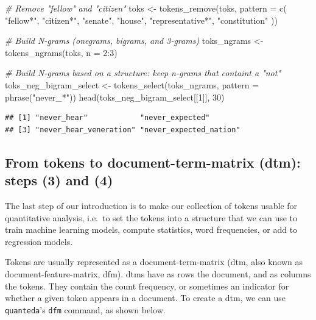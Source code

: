 \documentclass[
  12pt,
]{style/krantz}
\newenvironment{Shaded}{\begin{snugshade}}{\end{snugshade}}
\newcommand{\AttributeTok}[1]{\textcolor[rgb]{0.77,0.63,0.00}{#1}}
\newcommand{\CommentTok}[1]{\textcolor[rgb]{0.56,0.35,0.01}{\textit{#1}}}
\newcommand{\DecValTok}[1]{\textcolor[rgb]{0.00,0.00,0.81}{#1}}
\newcommand{\FunctionTok}[1]{\textcolor[rgb]{0.00,0.00,0.00}{#1}}
\newcommand{\NormalTok}[1]{#1}
\newcommand{\OtherTok}[1]{\textcolor[rgb]{0.56,0.35,0.01}{#1}}
\newcommand{\SpecialCharTok}[1]{\textcolor[rgb]{0.00,0.00,0.00}{#1}}
\newcommand{\StringTok}[1]{\textcolor[rgb]{0.31,0.60,0.02}{#1}}
\begin{document}
\begin{Shaded}
\begin{Highlighting}[]
\CommentTok{\# Remove "fellow" and "citizen"}
\NormalTok{toks }\OtherTok{\textless{}{-}} \FunctionTok{tokens\_remove}\NormalTok{(toks, }\AttributeTok{pattern =} \FunctionTok{c}\NormalTok{(}
    \StringTok{"fellow*"}\NormalTok{,}
    \StringTok{"citizen*"}\NormalTok{,}
    \StringTok{"senate"}\NormalTok{,}
    \StringTok{"house"}\NormalTok{,}
    \StringTok{"representative*"}\NormalTok{,}
    \StringTok{"constitution"}
\NormalTok{))}

\CommentTok{\# Build N{-}grams (onegrams, bigrams, and 3{-}grams)}
\NormalTok{toks\_ngrams }\OtherTok{\textless{}{-}} \FunctionTok{tokens\_ngrams}\NormalTok{(toks, }\AttributeTok{n =} \DecValTok{2}\SpecialCharTok{:}\DecValTok{3}\NormalTok{)}

\CommentTok{\# Build N{-}grams based on a structure: keep n{-}grams that containt a "not"}
\NormalTok{toks\_neg\_bigram\_select }\OtherTok{\textless{}{-}} \FunctionTok{tokens\_select}\NormalTok{(toks\_ngrams, }\AttributeTok{pattern =} \FunctionTok{phrase}\NormalTok{(}\StringTok{"never\_*"}\NormalTok{))}
\FunctionTok{head}\NormalTok{(toks\_neg\_bigram\_select[[}\DecValTok{1}\NormalTok{]], }\DecValTok{30}\NormalTok{)}
\end{Highlighting}
\end{Shaded}

\begin{verbatim}
## [1] "never_hear"            "never_expected"       
## [3] "never_hear_veneration" "never_expected_nation"
\end{verbatim}

\hfill\break

\hypertarget{from-tokens-to-document-term-matrix-dtm-steps-3-and-4}{%
\subsection{From tokens to document-term-matrix (dtm): steps (3) and (4)}\label{from-tokens-to-document-term-matrix-dtm-steps-3-and-4}}

The last step of our introduction is to make our collection of tokens usable for quantitative analysis, i.e.~to set the tokens into a structure that we can use to train machine learning models, compute statistics, word frequencies, or add to regression models.

Tokens are usually represented as a document-term-matrix (dtm, also known as document-feature-matrix, dfm). dtms have as rows the document, and as columns the tokens. They contain the count frequency, or sometimes an indicator for whether a given token appears in a document. To create a dtm, we can use \texttt{quanteda}'s \texttt{dfm} command, as shown below.
\end{document}
